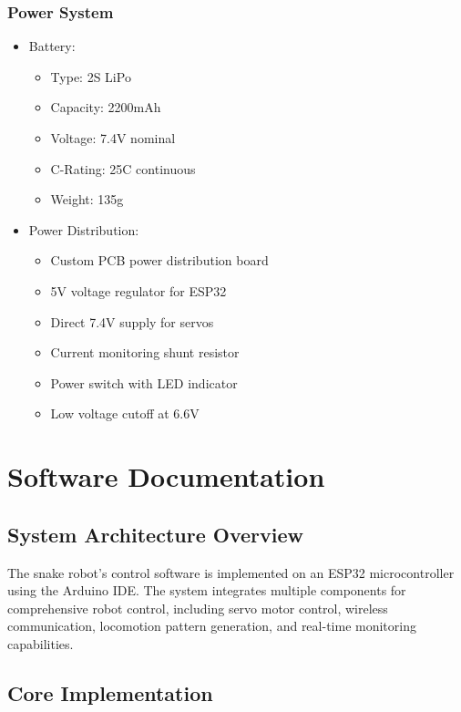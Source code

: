 \documentclass[12pt,a4paper]{report}
\begin{document}
\subsection{Power System}
\begin{itemize}
\item Battery:
\begin{itemize}
\item Type: 2S LiPo
\item Capacity: 2200mAh
\item Voltage: 7.4V nominal
\item C-Rating: 25C continuous
\item Weight: 135g
\end{itemize}
\item Power Distribution:
\begin{itemize}
    \item Custom PCB power distribution board
    \item 5V voltage regulator for ESP32
    \item Direct 7.4V supply for servos
    \item Current monitoring shunt resistor
    \item Power switch with LED indicator
    \item Low voltage cutoff at 6.6V
\end{itemize}
\end{itemize}   
\chapter{Software Documentation}

\section{System Architecture Overview}
The snake robot's control software is implemented on an ESP32 microcontroller using the Arduino IDE. The system integrates multiple components for comprehensive robot control, including servo motor control, wireless communication, locomotion pattern generation, and real-time monitoring capabilities.

\section{Core Implementation}
\end{document}
